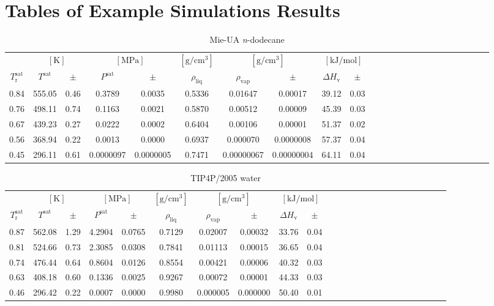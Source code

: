 \documentclass[%
 aip,
 jcp,
 sd,%
 amsmath,amssymb,
]{revtex4-1}
\begin{document}
\section{Tables of Example Simulations Results}
\begin{table*}[!htbp]
\centering
\caption{
Mie-UA \textit{n}-dodecane
}
\label{tab:Mie-C12-mie}
\begin{ruledtabular}
\begin{tabular}{cccccccccccccccccccccccc}
 & \multicolumn{2}{c}{$[\mathrm{K}]$} &	 \multicolumn{2}{c}{$[\mathrm{MPa}]$} & $[\mathrm{g/cm^3}]$ & \multicolumn{2}{c}{$[\mathrm{g/cm^3}]$} & \multicolumn{2}{c}{$[\mathrm{kJ/mol}]$} \\
$T_\mathrm{r}^{\mathrm{sat}}$ & $T^{\mathrm{sat}}$ & $\pm$ & $P^{\mathrm{sat}}$ & $\pm$ & $\rho_{\mathrm{liq}}$ & $\rho_{\mathrm{vap}}$ & $\pm$ & $\Delta H_{\mathrm{v}}$ & $\pm$
 \\
\hline		
0.84	&	555.05	&	0.46	&	0.3789	&	0.0035	&	0.5336	&	0.01647	&	0.00017	&	39.12	&	0.03	\\
0.76	&	498.11	&	0.74	&	0.1163	&	0.0021	&	0.5870	&	0.00512	&	0.00009	&	45.39	&	0.03	\\
0.67	&	439.23	&	0.27	&	0.0222	&	0.0002	&	0.6404	&	0.00106	&	0.00001	&	51.37	&	0.02	\\
0.56	&	368.94	&	0.22	&	0.0013	&	0.0000	&	0.6937	&	0.000070	&	0.0000008	&	57.37	&	0.04	\\
0.45	&	296.11	&	0.61	&	0.0000097	&	0.0000005	&	0.7471	&	0.00000067	&	0.00000004	&	64.11	&	0.04	\\
\end{tabular}
\end{ruledtabular}
\end{table*}


\begin{table*}[!htbp]
\centering
\caption{
TIP4P/2005 water
}
\label{tab:TIP4P2005-water-nistsim}
\begin{ruledtabular}
\begin{tabular}{cccccccccccccccccccccccc}
 & \multicolumn{2}{c}{$[\mathrm{K}]$} &	 \multicolumn{2}{c}{$[\mathrm{MPa}]$} & $[\mathrm{g/cm^3}]$ & \multicolumn{2}{c}{$[\mathrm{g/cm^3}]$} & \multicolumn{2}{c}{$[\mathrm{kJ/mol}]$} \\
$T_\mathrm{r}^{\mathrm{sat}}$ & $T^{\mathrm{sat}}$ & $\pm$ & $P^{\mathrm{sat}}$ & $\pm$ & $\rho_{\mathrm{liq}}$ & $\rho_{\mathrm{vap}}$ & $\pm$ & $\Delta H_{\mathrm{v}}$ & $\pm$
 \\
\hline		
0.87	&	562.08	&	1.29	&	4.2904	&	0.0765	&	0.7129	&	0.02007	&	0.00032	&	33.76	&	0.04	\\
0.81	&	524.66	&	0.73	&	2.3085	&	0.0308	&	0.7841	&	0.01113	&	0.00015	&	36.65	&	0.04	\\
0.74	&	476.44	&	0.64	&	0.8604	&	0.0126	&	0.8554	&	0.00421	&	0.00006	&	40.32	&	0.03	\\
0.63	&	408.18	&	0.60	&	0.1336	&	0.0025	&	0.9267	&	0.00072	&	0.00001	&	44.33	&	0.03	\\
0.46	&	296.42	&	0.22	&	0.0007	&	0.0000	&	0.9980	&	0.000005	&	0.000000	&	50.40	&	0.01	\\
\end{tabular}
\end{ruledtabular}
\end{table*}
\end{document}
